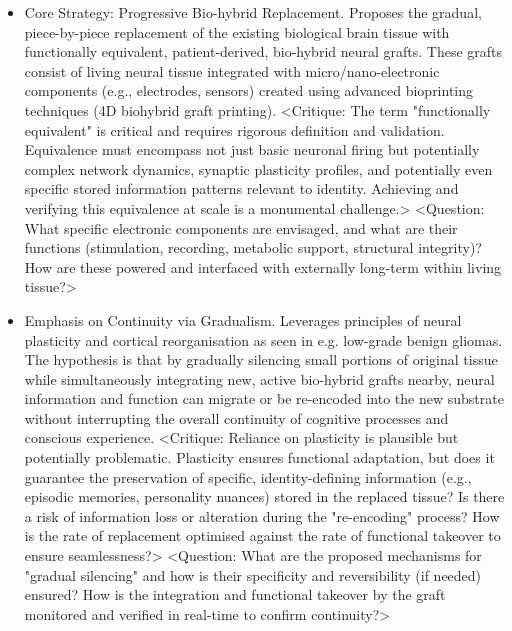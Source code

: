 \documentclass[10pt]{article}
\begin{document}
\begin{sloppypar}
  \begin{itemize}
    \item Core Strategy: Progressive Bio-hybrid Replacement. Proposes the gradual, piece-by-piece replacement of the existing biological brain tissue with functionally equivalent, patient-derived, bio-hybrid neural grafts. These grafts consist of living neural tissue integrated with micro/nano-electronic components (e.g., electrodes, sensors) created using advanced bioprinting techniques (4D biohybrid graft printing). <Critique: The term "functionally equivalent" is critical and requires rigorous definition and validation. Equivalence must encompass not just basic neuronal firing but potentially complex network dynamics, synaptic plasticity profiles, and potentially even specific stored information patterns relevant to identity. Achieving and verifying this equivalence at scale is a monumental challenge.> <Question: What specific electronic components are envisaged, and what are their functions (stimulation, recording, metabolic support, structural integrity)? How are these powered and interfaced with externally long-term within living tissue?>

    \item Emphasis on Continuity via Gradualism. Leverages principles of neural plasticity and cortical reorganisation as seen in e.g. low-grade benign gliomas. The hypothesis is that by gradually silencing small portions of original tissue while simultaneously integrating new, active bio-hybrid grafts nearby, neural information and function can migrate or be re-encoded into the new substrate without interrupting the overall continuity of cognitive processes and conscious experience. <Critique: Reliance on plasticity is plausible but potentially problematic. Plasticity ensures functional adaptation, but does it guarantee the preservation of specific, identity-defining information (e.g., episodic memories, personality nuances) stored in the replaced tissue? Is there a risk of information loss or alteration during the "re-encoding" process? How is the rate of replacement optimised against the rate of functional takeover to ensure seamlessness?> <Question: What are the proposed mechanisms for "gradual silencing" and how is their specificity and reversibility (if needed) ensured? How is the integration and functional takeover by the graft monitored and verified in real-time to confirm continuity?>


\end{itemize}
\end{sloppypar}
\end{document}
